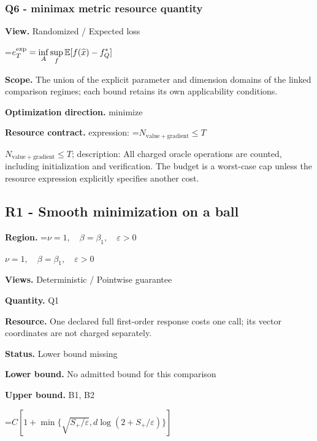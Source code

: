 \documentclass[10pt,a4paper]{article}
\newcommand{\AtlasMath}[1]{\par\begingroup\centering\setbox0=\hbox{$\displaystyle #1$}\ifdim\wd0>1.4\linewidth\typeout{ATLAS WIDE FORMULA: \the\wd0}\fi\ifdim\wd0>\linewidth\resizebox{\linewidth}{!}{\box0}\else\box0\fi\par\endgroup}
\newcommand{\AtlasInlineMath}[1]{\begingroup\setbox0=\hbox{$#1$}\ifdim\wd0>.4\linewidth\endgroup\AtlasMath{#1}\else\endgroup$#1$\fi}
\begin{document}
\subsubsection{Q6 - minimax metric resource quantity}


\textbf{View.} Randomized / Expected loss



\AtlasMath{e_T^{\rm exp}=\inf_A\sup_f\mathbb E[f(\widehat x)-f_Q^*]}


\textbf{Scope.} The union of the explicit parameter and dimension domains of the linked comparison regimes; each bound retains its own applicability conditions.



\textbf{Optimization direction.} minimize



\textbf{Resource contract.} expression: \AtlasInlineMath{N_{\mathrm{value+gradient}}\le T}; description: All charged oracle operations are counted, including initialization and verification. The budget is a worst-case cap unless the resource expression explicitly specifies another cost.



\subsection{R1 - Smooth minimization on a ball}


\textbf{Region.} \AtlasInlineMath{\nu=1,\quad\beta=\beta_1,\quad\varepsilon>0}



\textbf{Views.} Deterministic / Pointwise guarantee



\textbf{Quantity.} Q1



\textbf{Resource.} One declared full first-order response costs one call; its vector coordinates are not charged separately.



\textbf{Status.} Lower bound missing



\textbf{Lower bound.} No admitted bound for this comparison



\textbf{Upper bound.} B1, B2



\AtlasMath{C[1+\min\{\sqrt{S_+/\varepsilon},d\log(2+S_+/\varepsilon)\}]}
\end{document}
